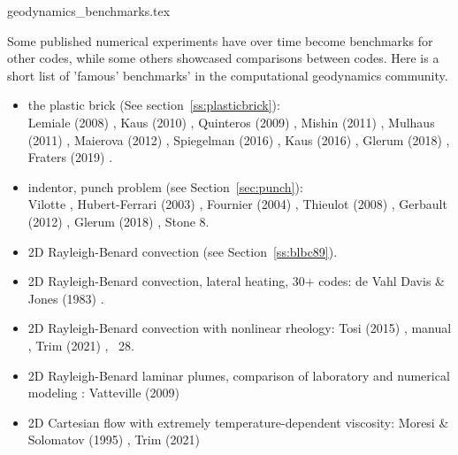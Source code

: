 
\begin{flushright} {\tiny {\color{gray} geodynamics\_benchmarks.tex}} \end{flushright}

Some published numerical experiments have over time become benchmarks for other codes, while some 
others showcased comparisons between codes. Here is a short list of 'famous' benchmarks' in the 
computational geodynamics community.

\begin{itemize}

\item the plastic brick (See section~\ref{ss:plasticbrick}): \\
      Lemiale \etal (2008) \cite{lemm08}, 
      Kaus (2010) \cite{kaus10}, 
      Quinteros \etal (2009) \cite{qurj09}, 
      Mishin (2011) \cite{mishin11}, 
      Mulhaus \etal (2011) \cite{muso11}, 
      Maierova (2012) \cite{maie12}, 
      Spiegelman \etal (2016) \cite{spmw16}, 
      Kaus \etal (2016) \cite{kapb16}, 
      Glerum \etal (2018) \cite{gltf18}, 
      Fraters \etal (2019) \cite{frbt19}.

\item indentor, punch problem (see Section~\ref{sec:punch}):\\
      Vilotte \etal \cite{vidm82,vidm84,vimd86},
      Hubert-Ferrari \etal (2003) \cite{hukm03}, 
      Fournier \etal (2004) \cite{fojd04}, 
      Thieulot \etal (2008) \cite{thfb08},
      Gerbault (2012) \cite{gerb12}, 
      Glerum \etal (2018) \cite{gltf18},
      Stone 8.

\item 2D Rayleigh-Benard convection (see Section~\ref{ss:blbc89}).


\item 2D Rayleigh-Benard convection, lateral heating, 30+ codes: 
      de Vahl Davis \& Jones (1983) \cite{dejo83}.
\item 2D Rayleigh-Benard convection with nonlinear rheology:  
      Tosi \etal (2015) \cite{tosn15}, \aspect{} manual \cite{aspectmanual}, 
      Trim \etal (2021) \cite{trbs21}, \stone~28.
\item 2D Rayleigh-Benard laminar plumes, comparison of laboratory and numerical modeling : 
      Vatteville \etal (2009) \cite{vavl09}
\item 2D Cartesian flow with extremely temperature-dependent viscosity:
      Moresi \& Solomatov (1995) \cite{moso95}, Trim \etal (2021) \cite{trbs21}


\end{itemize}
